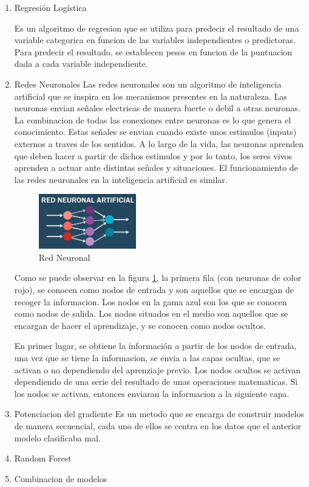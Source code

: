 \documentclass[spanish,12pt, a4paper,twoside]{paper}
\begin{document}
\begin{enumerate}
\item Regresión Logística

Es un algoritmo de regresion que se utiliza para predecir el resultado de una variable categorica en funcion de las variables independientes o predictoras. Para predecir el resultado, se establecen pesos en funcion de la puntuacion dada a cada variable independiente.

\item Redes Neuronales
Las redes neuronales son un algoritmo de inteligencia artificial que se inspira en los mecanismos presentes en la naturaleza. Las neuronas envian señales electricas de manera fuerte o debil a otras neuronas. La combinacion de todas las conexiones entre neuronas es lo que genera el conocimiento. Estas señales se envian cuando existe unos estimulos (inputs) externos a traves de los sentidos. A lo largo de la vida, las neuronas aprenden que deben hacer a partir de dichos estimulos y por lo tanto, los seres vivos aprenden a actuar ante distintas señales y situaciones. El funcionamiento de las redes neuronales en la inteligencia artificial es similar.

\begin{figure}[htb]
\centering
 \includegraphics[width=0.4\textwidth]{recursos/red-neuronal}
\caption{Red Neuronal}
\label {fig:RedNeuronal}
\end{figure}
\FloatBarrier

Como se puede observar en la figura \ref{fig:RedNeuronal}, la primera fila (con neuronas de color rojo), se conocen como nodos de entrada y son aquellos que se encargan de recoger la informacion. Los nodos en la gama azul son los que se conocen como nodos de salida. Los nodos situados en el medio son aquellos que se encargan de hacer el aprendizaje, y se conocen como nodos ocultos.

En primer lugar, se obtiene la información a partir de los nodos de entrada, una vez que se tiene la informacion, se envia a las capas ocultas, que se activan o no dependiendo del aprenziaje previo. Los nodos ocultos se activan dependiendo de una serie del resultado de unas operaciones matematicas. Si los nodos se activan, entonces enviaran la informacion a la siguiente capa.

\item Potenciacion del gradiente
Es un metodo que se encarga de construir modelos de manera secuencial, cada uno de ellos se centra en los datos que el anterior modelo clasificaba mal.
\item Random Forest
\item Combinacion de modelos
\end{enumerate}
\end{document}
